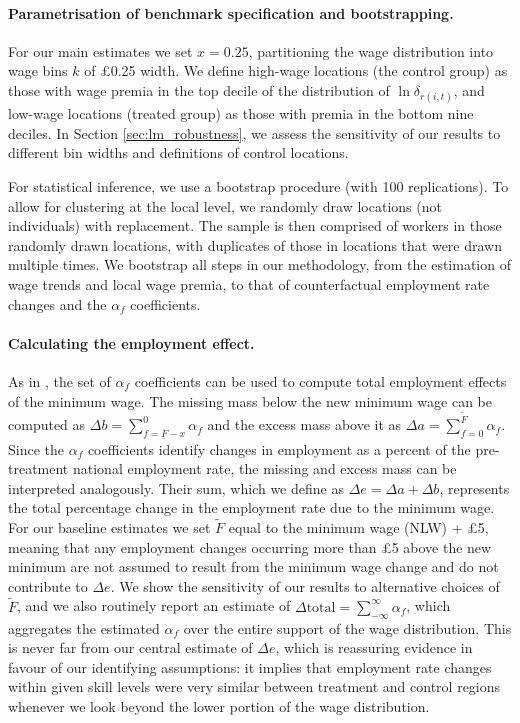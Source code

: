\paragraph{Parametrisation of benchmark specification and bootstrapping.} For our main estimates we set $x=0.25$, partitioning the wage distribution into wage bins $k$ of \pounds 0.25 width. We define high-wage locations (the control group) as those with wage premia in the top decile of the distribution of $\ln \delta_{r(i,t)}$, and low-wage locations (treated group) as those with premia in the bottom nine deciles. In Section \ref{sec:lm_robustness}, we assess the sensitivity of our results to different bin widths and definitions of control locations. 

For statistical inference, we use a bootstrap procedure (with 100 replications). To allow for clustering at the local level, we randomly draw locations (not individuals) with replacement. The sample is then comprised of workers in those randomly drawn locations, with duplicates of those in locations that were drawn multiple times. We bootstrap all steps in our methodology, from the estimation of wage trends and local wage premia, to that of counterfactual employment rate changes and the $\alpha_f$ coefficients. 


\paragraph{Calculating the employment effect.} As in \cite{Cengiz2019}, the set of $\alpha_f$ coefficients can be used to compute total employment effects of the minimum wage. The missing mass below the new minimum wage can be computed as $\Delta b = \sum_{f=\underline{F}-x}^{0} \alpha_f$ and the excess mass above it as $\Delta a = \sum_{f=0}^{\tilde{F}}{\alpha}_f$. Since the $\alpha_f$ coefficients identify changes in employment as a percent of the pre-treatment national employment rate, the missing and excess mass can be interpreted analogously. Their sum, which we define as $\Delta e = \Delta a + \Delta b$, represents the total percentage change in the employment rate due to the minimum wage. For our baseline estimates we set $\tilde{F}$ equal to the minimum wage (NLW) + \pounds 5, meaning that any employment changes occurring more than £5 above the new minimum are not assumed to result from the minimum wage change and do not contribute to $\Delta e$. We show the sensitivity of our results to alternative choices of $\tilde{F}$, and we also routinely report an estimate of $\Delta \text{total} = \sum_{-\infty}^{\infty}{\alpha}_f$, which aggregates the estimated $\alpha_f$ over the entire support of the wage distribution. This is never far from our central estimate of $\Delta e$, which is reassuring evidence in favour of our identifying assumptions: it implies that employment rate changes within given skill levels were very similar between treatment and control regions whenever we look beyond the lower portion of the wage distribution.  \par
 
